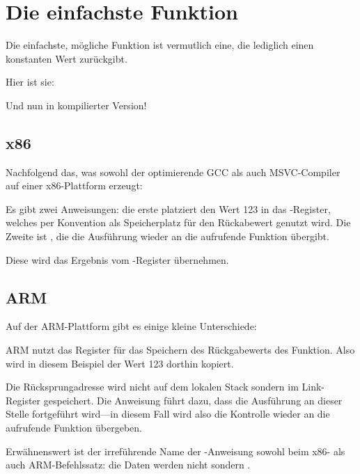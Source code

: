 \section{Die einfachste Funktion}

Die einfachste, mögliche Funktion ist vermutlich eine, die lediglich einen konstanten Wert zurückgibt.

Hier ist sie:



Und nun in kompilierter Version!

\subsection{x86}

Nachfolgend das, was sowohl der optimierende GCC als auch MSVC-Compiler auf einer x86-Plattform erzeugt:



Es gibt zwei Anweisungen: die erste platziert den Wert 123 in das \EAX-Register, welches per Konvention
als Speicherplatz für den Rückabewert genutzt wird. Die Zweite ist \RET, die die Ausführung wieder an
die aufrufende Funktion übergibt.

Diese wird das Ergebnis vom \EAX-Register übernehmen.

\subsection{ARM}

Auf der ARM-Plattform gibt es einige kleine Unterschiede:



ARM nutzt das Register  für das Speichern des Rückgabewerts des Funktion. Also wird in diesem Beispiel
der Wert 123 dorthin kopiert.

Die Rücksprungadresse wird nicht auf dem lokalen Stack sondern im Link-Register gespeichert.
Die Anweisung  führt dazu, dass die Ausführung an dieser Stelle fortgeführt wird---in diesem Fall wird
also die Kontrolle wieder an die aufrufende Funktion übergeben.

Erwähnenswert ist der irreführende Name der \MOV-Anweisung sowohl beim x86- als auch ARM-Befehlssatz:
die Daten werden nicht  sondern .

